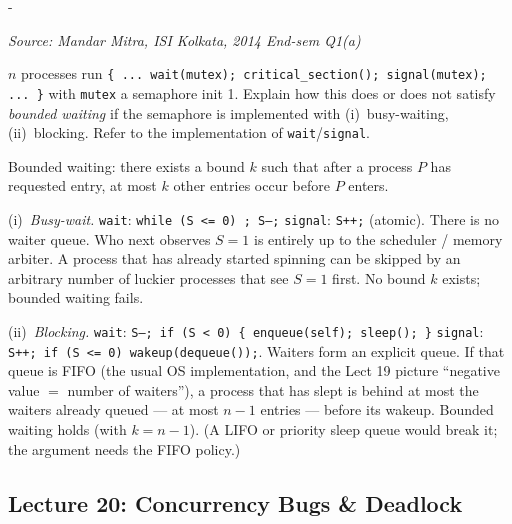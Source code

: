 \documentclass[11pt,a4paper]{article}
\makeatletter
\newcommand{\keepspace}[1]{\par\penalty-100\begingroup
  \setlength{\dimen@}{#1}\dimen@ii\pagegoal\advance\dimen@ii-\pagetotal
  \ifdim\dimen@>\dimen@ii\ifdim\dimen@ii>\z@\vfil\fi\break\fi\endgroup}
\newcounter{qn}[section]
\newenvironment{Qn}[4]{%
  \refstepcounter{qn}\keepspace{7\baselineskip}%
  \begin{tcolorbox}[qboxstyle, title={Q\thesection.\theqn\ \ [#1 \textbar\ #2]\ \ #4}]%
  {\footnotesize\color{g3}\textit{Source: #3}}\par\smallskip%
}{%
  \end{tcolorbox}%
}
\newenvironment{Sol}{%
  \begin{tcolorbox}[sboxstyle, title={Solution}]%
}{%
  \end{tcolorbox}\vspace{0.35em}%
}
\makeatother
\begin{document}
\begin{Qn}{Medium-Hard}{Lect 19}{Mandar Mitra, ISI Kolkata, 2014 End-sem Q1(a)}{Bounded waiting: busy-wait vs blocking mutex}
$n$ processes run
\texttt{\{ ... wait(mutex); critical\_section(); signal(mutex); ... \}}
with \texttt{mutex} a semaphore init 1. Explain how this does or does
not satisfy \emph{bounded waiting} if the semaphore is implemented with
(i)~busy-waiting, (ii)~blocking. Refer to the implementation of
\texttt{wait}/\texttt{signal}.
\end{Qn}
\begin{Sol}
Bounded waiting: there exists a bound $k$ such that after a process $P$
has requested entry, at most $k$ other entries occur before $P$ enters.

(i)~\emph{Busy-wait.}
\texttt{wait}: \texttt{while (S <= 0) ; S--;}\quad
\texttt{signal}: \texttt{S++;}\quad
(atomic). There is no waiter queue. Who next observes $S=1$ is entirely
up to the scheduler / memory arbiter. A process that has already
started spinning can be skipped by an arbitrary number of luckier
processes that see $S=1$ first. No bound $k$ exists; bounded waiting
fails.

(ii)~\emph{Blocking.}
\texttt{wait}: \texttt{S--; if (S < 0) \{ enqueue(self); sleep(); \}}\quad
\texttt{signal}: \texttt{S++; if (S <= 0) wakeup(dequeue());}.
Waiters form an explicit queue. If that queue is FIFO (the usual OS
implementation, and the Lect 19 picture ``negative value $=$ number of
waiters''), a process that has slept is behind at most the waiters
already queued --- at most $n-1$ entries --- before its wakeup. Bounded
waiting holds (with $k = n-1$). (A LIFO or priority sleep queue would
break it; the argument needs the FIFO policy.)
\end{Sol}

\subsection{Lecture 20: Concurrency Bugs \& Deadlock}
\end{document}
